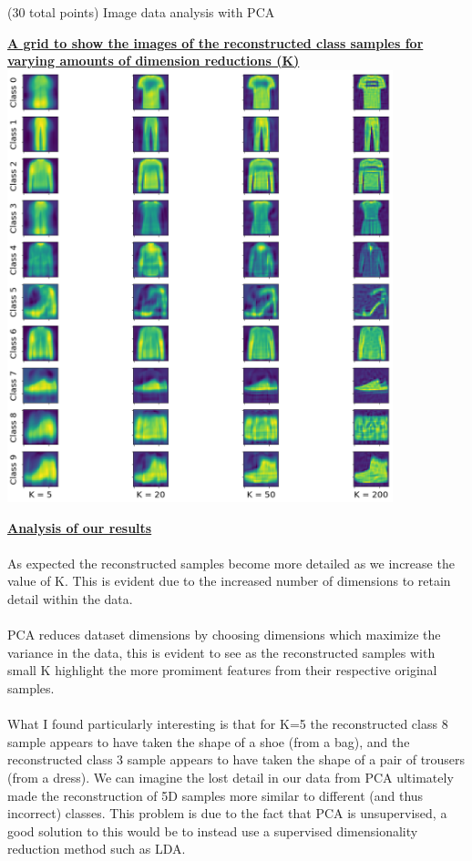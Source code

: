 \documentclass[12pt]{article}
\begin{document}
\begin{question}{(30 total points) Image data analysis with PCA}
\begin{subquestion}
   

      \begin{answerbox}{52em}
        \begin{center}
        \textbf{\underline{A grid to show the images of the reconstructed class samples for}}\\
        \textbf{\underline{varying amounts of dimension reductions (K)}}
        \vspace{0.3cm}\\
         \includegraphics[width=0.84\textwidth]{images/q17.png}
        \end{center}
        \footnotesize{\textbf{\underline{Analysis of our results}}}\\
        \scriptsize{
\\
        As expected the reconstructed samples become more detailed as we increase the value of K. This is evident due to the increased number of dimensions to retain detail within the data.\\
\\
        PCA reduces dataset dimensions by choosing dimensions which maximize the variance in the data, this is evident to see as the reconstructed samples with small K highlight the more promiment features from their respective original samples.\\
\\
        What I found particularly interesting is that for K=5 the reconstructed class 8 sample appears to have taken the shape of a shoe (from a bag), and the reconstructed class 3 sample appears to have taken the shape of a pair of trousers (from a dress). We can imagine the lost detail in our data from PCA ultimately made the reconstruction of 5D samples more similar to different (and thus incorrect) classes. This problem is due to the fact that PCA is unsupervised, a good solution to this would be to instead use a supervised dimensionality reduction method such as LDA.}
      \end{answerbox}
  



\end{subquestion}
\end{question}
\end{document}
